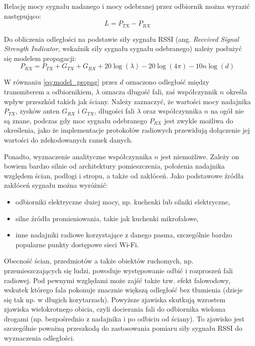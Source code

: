 Relację mocy sygnału nadanego i mocy odebranej przez odbiornik można wyrazić następująco: 
\begin{equation}
\label{eq:L}
 L = P_{TX} - P_{RX}
\end{equation}

Do obliczenia odległości na podstawie siły sygnału RSSI (ang. \textit{Received Signal Strength Indicator}, wskaźnik siły sygnału sygnału odebranego) należy posłużyć się modelem propagacji:
\begin{equation}
\label{eq:model_propag}
 P_{RX} = P_{TX}+G_{TX}+G_{RX} + 20\log(\lambda) - 20\log(4\pi) -10n\log(d)
\end{equation}

W równaniu \ref{eq:model_propag} przez $d$ oznaczono odległość między transmiterem a odbiornikiem, $\lambda$ oznacza długość fali, zaś współczynnik $n$ określa wpływ przeszkód takich jak ściany. Należy zaznaczyć, że wartości mocy nadajnika $P_{TX}$, zysków anten $G_{RX}$ i $G_{TX}$, długości fali $\lambda$ oraz współczynnika $n$ na ogół nie są znane, podczas gdy moc sygnału odebranego $P_{RX}$ jest zwykle możliwa do określenia, jako że implementacje protokołów radiowych przewidują dołączenie jej wartości do zdekodowanych ramek danych. 

Ponadto, wyznaczenie analityczne współczynnika $n$ jest niemożliwe. Zależy on bowiem bardzo silnie od architektury pomieszczenia, położenia nadajnika względem ścian, podłogi i stropu, a także od zakłóceń. Jako podstawowe źródła zakłóceń sygnału można wyróżnić:

\begin{itemize}
 \item odbiorniki elektryczne dużej mocy, np. kuchenki lub silniki elektryczne,
 \item silne źródła promieniowania, takie jak kuchenki mikrofalowe,
 \item inne nadajniki radiowe korzystające z danego pasma, szczególnie bardzo popularne punkty dostępowe sieci Wi-Fi.
\end{itemize}

Obecność ścian, przedmiotów a także obiektów ruchomych, np. przemieszczających się ludzi, powoduje występowanie odbić i rozproszeń fali radiowej. Pod pewnymi względami może zajść także tzw. efekt falowodowy, wskutek którego fala pokonuje znacznie większą odległość bez tłumienia (dzieje się tak np. w długich korytarzach). Powyższe zjawiska skutkują wzrostem zjawiska wielokrotnego obicia, czyli docierania fali do odbiornika wieloma drogami (np. bezpośrednio z nadajnika i po odbiciu od ściany). To zjawisko jest szczególnie poważną przeszkodą do zastosowania pomiaru siły sygnału RSSI do wyznaczenia odległości. 

